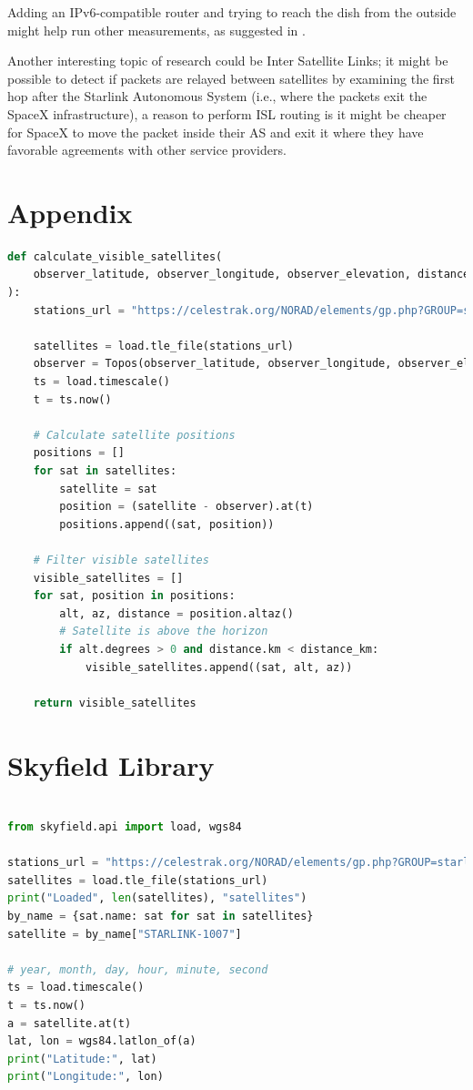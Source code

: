 \documentclass[IN,11pt,twoside,openright,idp,english]{tumthesis}
\begin{document}
Adding an IPv6-compatible router and trying to reach the dish from the outside might help run other measurements, as suggested in \cite{izhikevich2023democratizing}.

Another interesting topic of research could be Inter Satellite Links; it might be possible to detect if packets are relayed between satellites by examining the first hop after the Starlink Autonomous System (i.e., where the packets exit the SpaceX infrastructure), a reason to perform ISL routing is it might be cheaper for SpaceX to move the packet inside their AS and exit it where they have favorable agreements with other service providers.


\appendix
\chapter{Appendix}

\begin{lstlisting}[language=python,caption={the \texttt{calculate\_visible\_satellites} function},captionpos=b]
def calculate_visible_satellites(
    observer_latitude, observer_longitude, observer_elevation, distance_km
):
    stations_url = "https://celestrak.org/NORAD/elements/gp.php?GROUP=starlink&FORMAT=tle"

    satellites = load.tle_file(stations_url)
    observer = Topos(observer_latitude, observer_longitude, observer_elevation)
    ts = load.timescale()
    t = ts.now()

    # Calculate satellite positions
    positions = []
    for sat in satellites:
        satellite = sat
        position = (satellite - observer).at(t)
        positions.append((sat, position))

    # Filter visible satellites
    visible_satellites = []
    for sat, position in positions:
        alt, az, distance = position.altaz()
        # Satellite is above the horizon
        if alt.degrees > 0 and distance.km < distance_km:
            visible_satellites.append((sat, alt, az))

    return visible_satellites
\end{lstlisting}

\chapter{Skyfield Library}
\label{app:sky}

\begin{lstlisting}[language=python,caption={retrieving a Satellite's position using the Satname},captionpos=b]

from skyfield.api import load, wgs84

stations_url = "https://celestrak.org/NORAD/elements/gp.php?GROUP=starlink&FORMAT=tle"
satellites = load.tle_file(stations_url)
print("Loaded", len(satellites), "satellites")
by_name = {sat.name: sat for sat in satellites}
satellite = by_name["STARLINK-1007"]

# year, month, day, hour, minute, second
ts = load.timescale()
t = ts.now()
a = satellite.at(t)
lat, lon = wgs84.latlon_of(a)
print("Latitude:", lat)
print("Longitude:", lon)
\end{lstlisting}

\clearpage
\pagestyle{thesischapter}
\cleardoublepage
{}
\printbibliography[heading=bibintoc]
\clearpage
\pagestyle{empty}
\end{document}
